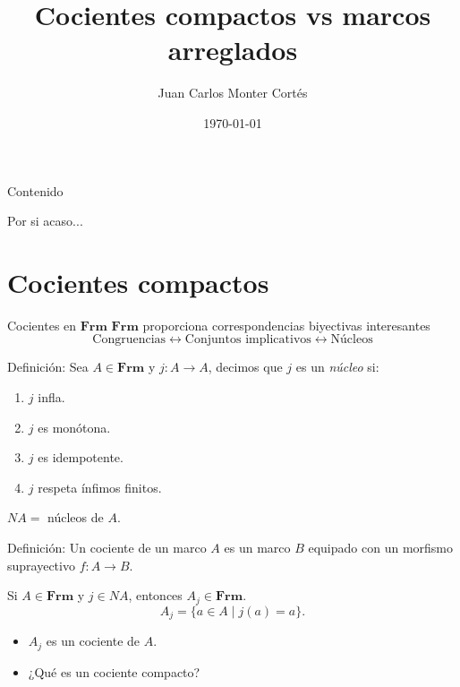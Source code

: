 \documentclass[compress,12pt]{beamer}
\title{Cocientes compactos vs marcos arreglados}
\date{\today}
\author{Juan Carlos Monter Cortés}
\institute{Universidad de Guadalajara}
\begin{document}
\frame[plain]{\titlepage}

\begin{frame}{Contenido}
\tableofcontents %
\end{frame}

\begin{frame}{Por si acaso...}

\end{frame}

\section{Cocientes compactos}
\begin{frame}{Cocientes en $\mathbf{Frm}$}
$\mathbf{Frm}$ proporciona correspondencias biyectivas interesantes
\[
\mbox{Congruencias}\leftrightarrow \mbox{Conjuntos implicativos}\leftrightarrow \mbox{Núcleos}
\]

\begin{block}{Definición:}
Sea $A\in \mathbf{Frm}$ y $j\colon A\to A$, decimos que $j$ es un \emph{núcleo} si:
\begin{enumerate}
    \item $j$ infla.
    \item $j$ es monótona.
    \item $j$ es idempotente.
    \item $j$ respeta ínfimos finitos.
\end{enumerate}
\end{block}

$NA=$ núcleos de $A$.
\end{frame}

\begin{frame}
\begin{block}{Definición:}
    Un cociente de un marco $A$ es un marco $B$ equipado con un morfismo suprayectivo $f\colon A\to B$.
\end{block}
Si $A\in \mathbf{Frm}$ y $j\in NA$, entonces $A_j\in \mathbf{Frm}$.
\[
A_j=\{a\in A\mid j(a)=a\}.
\]
\begin{itemize}
\item $A_j$ es un cociente de $A$.
\item ¿Qué es un cociente compacto?
\end{itemize}
\end{frame}
\end{document}
